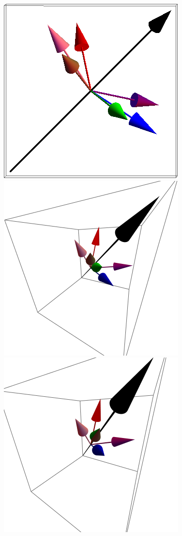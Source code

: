 \documentclass{article}
\begin{document}
\begin{figure}[ht]
\includegraphics[scale=0.32]{111_3000/501S000to005G.png}
\includegraphics[scale=0.3]{HVariedData/Pictures/111Inc46S.png}
\includegraphics[scale=0.3]{HVariedData/Pictures/111Inc52S.png}

\end{figure}
\end{document}
